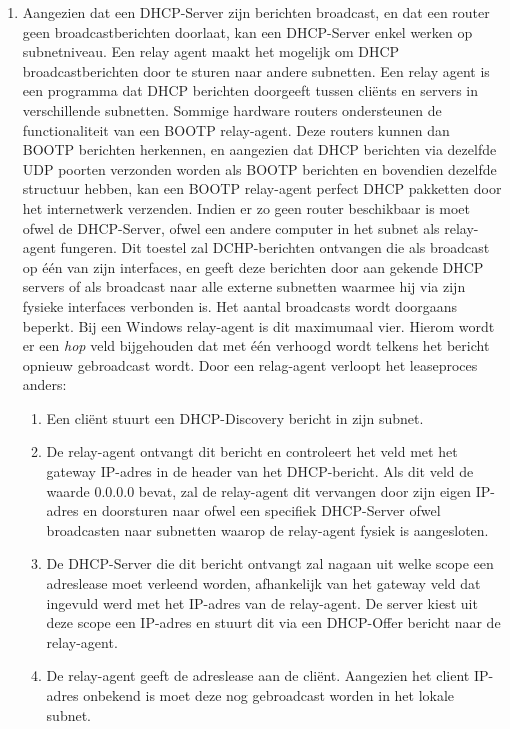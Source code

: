 \documentclass{report}
\begin{document}
\begin{enumerate}
\item {
Aangezien dat een DHCP-Server zijn berichten broadcast, en dat een router geen broadcastberichten doorlaat, kan een DHCP-Server enkel werken op subnetniveau. Een relay agent maakt het mogelijk om DHCP broadcastberichten door te sturen naar andere subnetten. Een relay agent is een programma dat DHCP berichten doorgeeft tussen cliënts en servers in verschillende subnetten. Sommige hardware routers ondersteunen de functionaliteit van een BOOTP relay-agent.  Deze routers kunnen dan BOOTP berichten herkennen, en aangezien dat DHCP berichten via dezelfde UDP poorten verzonden worden als BOOTP berichten en bovendien dezelfde structuur hebben, kan een BOOTP relay-agent perfect DHCP pakketten door het internetwerk verzenden. Indien er zo geen router beschikbaar is moet ofwel de DHCP-Server, ofwel een andere computer in het subnet als relay-agent fungeren. Dit toestel zal DCHP-berichten ontvangen die als broadcast op één van zijn interfaces, en geeft deze berichten door aan gekende DHCP servers of als broadcast naar alle externe subnetten waarmee hij via zijn fysieke interfaces verbonden is. Het aantal broadcasts wordt doorgaans beperkt. Bij een Windows relay-agent is dit maximumaal vier. Hierom wordt er een \textit{hop} veld bijgehouden dat met één verhoogd wordt telkens het bericht opnieuw gebroadcast wordt. Door een relag-agent verloopt het leaseproces anders:
\begin{enumerate}
\item Een cliënt stuurt een DHCP-Discovery bericht in zijn subnet.
\item De relay-agent ontvangt dit bericht en controleert het veld met het gateway IP-adres in de header van het DHCP-bericht. Als dit veld de waarde 0.0.0.0 bevat, zal de relay-agent dit vervangen door zijn eigen IP-adres en doorsturen naar ofwel een specifiek DHCP-Server ofwel broadcasten naar subnetten waarop de relay-agent fysiek is aangesloten. 
\item De DHCP-Server die dit bericht ontvangt zal nagaan uit welke scope een adreslease moet verleend worden, afhankelijk van het gateway veld dat ingevuld werd met het IP-adres van de relay-agent. De server kiest uit deze scope een IP-adres en stuurt dit via een DHCP-Offer bericht naar de relay-agent.
\item De relay-agent geeft de adreslease aan de cliënt. Aangezien het client IP-adres onbekend is moet deze nog gebroadcast worden in het lokale subnet.
\end{enumerate}
}
\end{enumerate}
\end{document}
